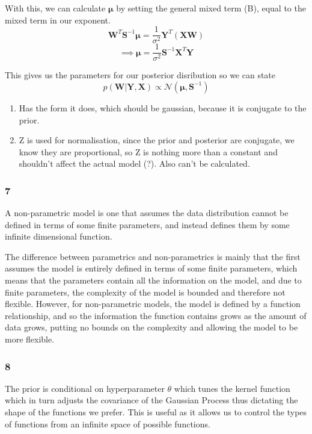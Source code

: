 \documentclass[11pt]{article}
\begin{document}
With this, we can calculate \(\boldsymbol{\mu}\) by setting the general
mixed term (B), equal to the mixed term in our exponent.
\[\boldsymbol{W}^T\boldsymbol{S}^{-1}\boldsymbol{\mu} = \frac{1}{\sigma^2}\boldsymbol{Y}^T(\boldsymbol{XW})\]
\[\implies \boldsymbol{\mu} = \frac{1}{\sigma^2}\boldsymbol{S}^{-1}\boldsymbol{X}^T\boldsymbol{Y}\]

This gives us the parameters for our posterior disribution so we can
state
\[p(\boldsymbol{W}|\boldsymbol{Y}, \boldsymbol{X}) \propto \mathcal{N}(\boldsymbol{\mu},\boldsymbol{S}^{-1}) \]

\begin{enumerate}
\def\labelenumi{\alph{enumi})}
\setcounter{enumi}{1}
\item
  Has the form it does, which should be gaussian, because it is
  conjugate to the prior.
\item
  Z is used for normalisation, since the prior and posterior are
  conjugate, we know they are proportional, so Z is nothing more than a
  constant and shouldn't affect the actual model (?). Also can't be
  calculated.
\end{enumerate}

    \subsubsection{7}\label{section}

A non-parametric model is one that assumes the data distribution cannot
be defined in terms of some finite parameters, and instead defines them
by some infinite dimensional function.

The difference between parametrics and non-parametrics is mainly that
the first assumes the model is entirely defined in terms of some finite
parameters, which means that the parameters contain all the information
on the model, and due to finite parameters, the complexity of the model
is bounded and therefore not flexible. However, for non-parametric
models, the model is defined by a function relationship, and so the
information the function contains grows as the amount of data grows,
putting no bounds on the complexity and allowing the model to be more
flexible.

    \subsubsection{8}\label{section}

The prior is conditional on hyperparameter \(\theta\) which tunes the
kernel function which in turn adjusts the covariance of the Gaussian
Process thus dictating the shape of the functions we prefer. This is
useful as it allows us to control the types of functions from an
infinite space of possible functions.
\end{document}
